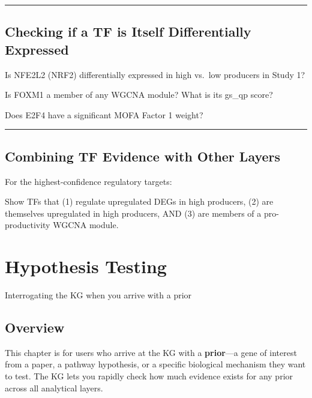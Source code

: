 \documentclass[
  letterpaper,
  oneside,
  open=any]{scrbook}
\begin{document}
\begin{center}\rule{0.5\linewidth}{0.5pt}\end{center}

\section{Checking if a TF is Itself Differentially
Expressed}\label{checking-if-a-tf-is-itself-differentially-expressed}

Is NFE2L2 (NRF2) differentially expressed in high vs.~low producers in
Study 1?

Is FOXM1 a member of any WGCNA module? What is its gs\_qp score?

Does E2F4 have a significant MOFA Factor 1 weight?

\begin{center}\rule{0.5\linewidth}{0.5pt}\end{center}

\section{Combining TF Evidence with Other
Layers}\label{combining-tf-evidence-with-other-layers}

For the highest-confidence regulatory targets:

Show TFs that (1) regulate upregulated DEGs in high producers, (2) are
themselves upregulated in high producers, AND (3) are members of a
pro-productivity WGCNA module.


\chapter{Hypothesis Testing}\label{hypothesis-testing}

Interrogating the KG when you arrive with a prior

\hfill\break

\section{Overview}\label{sec-hypothesis}

This chapter is for users who arrive at the KG with a \textbf{prior}---a
gene of interest from a paper, a pathway hypothesis, or a specific
biological mechanism they want to test. The KG lets you rapidly check
how much evidence exists for any prior across all analytical layers.
\end{document}
